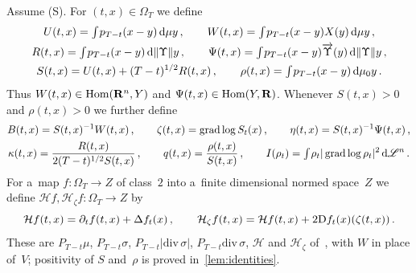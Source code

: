\documentclass[a4paper,twoside,leqno]{article}
\newcommand{\heatop}{\mathcal{H}}          %
\newcommand{\dUps}{\overrightarrow{\Upsilon}} %
\begin{document}
\begin{definition}
    \label{def:heat_objects}
    Assume (S). For $(t,x) \in \Omega_T$ we define
    \begin{gather}
        U(t,x) = \textint{}{} p_{T-t}(x-y) \ud \mu y \,, \qquad
        W(t,x) = \textint{}{} p_{T-t}(x-y) X(y) \ud \mu y \,, \\
        R(t,x) = \textint{}{} p_{T-t}(x-y) \ud \|\Upsilon\| y \,, \qquad
        \Psi(t,x) = \textint{}{} p_{T-t}(x-y) \dUps(y) \ud \|\Upsilon\| y \,, \\
        S(t,x) = U(t,x) + (T-t)^{1/2} R(t,x) \,, \qquad
        \rho(t,x) = \textint{}{} p_{T-t}(x-y) \ud \mu_0 y \,.
    \end{gather}
    Thus $W(t,x) \in \operatorname{Hom}(\mathbf{R}^{n},Y)$ and $\Psi(t,x) \in \operatorname{Hom}(Y,\mathbf{R})$. Whenever $S(t,x) > 0$ and
    $\rho(t,x) > 0$ we further define
    \begin{gather}
        B(t,x) = S(t,x)^{-1} W(t,x) \,, \qquad
        \zeta(t,x) = \operatorname{grad} \log S_t(x) \,, \qquad
        \eta(t,x) = S(t,x)^{-1} \Psi(t,x) \,, \\
        \kappa(t,x) = \frac{R(t,x)}{2 (T-t)^{1/2} S(t,x)} \,, \qquad
        q(t,x) = \frac{\rho(t,x)}{S(t,x)} \,, \qquad
        I(\rho_t) = {\textstyle\int_{}^{}} \rho_t |\operatorname{grad} \log \rho_t|^2 \,\mathrm{d} \mathscr{L}^{n} \,.
    \end{gather}
    For a~map $f : \Omega_T \to Z$ of class~$2$ into a~finite dimensional normed space~$Z$ we
    define $\heatop f, \heatop_\zeta f : \Omega_T \to Z$ by
    \begin{displaymath}
        \heatop f(t,x) = \partial_t f(t,x) + \Delta f_t(x) \,, \qquad
        \heatop_\zeta f(t,x) = \heatop f(t,x) + 2 \uD f_t(x)(\zeta(t,x)) \,.
    \end{displaymath}
    These are $P_{T-t}\mu$, $P_{T-t}\sigma$, $P_{T-t}|\mathrm{div}\,\sigma|$,
    $P_{T-t}\mathrm{div}\,\sigma$, $\mathcal{H}$ and $\mathcal{H}_\zeta$
    of~\cite[(3.1), (3.2), (3.4), (3.6)]{DePhilippisGennaioliPigatiRindler2026}, with $W$ in place
    of~$V$; positivity of $S$ and~$\rho$ is proved in~\ref{lem:identities}.
\end{definition}
\end{document}
